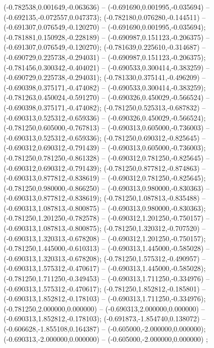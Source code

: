  (-0.782538,0.001649,-0.063636) -- (-0.691690,0.001995,-0.035694) -- (-0.692135,-0.072557,0.047373);
 (-0.782180,0.076280,-0.144511) -- (-0.691307,0.076549,-0.120270) -- (-0.691690,0.001995,-0.035694);
 (-0.781881,0.150928,-0.228189) -- (-0.690987,0.151123,-0.206375) -- (-0.691307,0.076549,-0.120270);
 (-0.781639,0.225610,-0.314687) -- (-0.690729,0.225738,-0.294031) -- (-0.690987,0.151123,-0.206375);
 (-0.781456,0.300342,-0.404021) -- (-0.690533,0.300414,-0.383259) -- (-0.690729,0.225738,-0.294031);
 (-0.781330,0.375141,-0.496209) -- (-0.690398,0.375171,-0.474082) -- (-0.690533,0.300414,-0.383259);
 (-0.781263,0.450024,-0.591270) -- (-0.690326,0.450029,-0.566524) -- (-0.690398,0.375171,-0.474082);
 (-0.781250,0.525313,-0.687832) -- (-0.690313,0.525312,-0.659336) -- (-0.690326,0.450029,-0.566524);
 (-0.781250,0.605000,-0.767813) -- (-0.690313,0.605000,-0.736003) -- (-0.690313,0.525312,-0.659336);
 (-0.781250,0.690312,-0.825645) -- (-0.690312,0.690312,-0.791439) -- (-0.690313,0.605000,-0.736003);
 (-0.781250,0.781250,-0.861328) -- (-0.690312,0.781250,-0.825645) -- (-0.690312,0.690312,-0.791439);
 (-0.781250,0.877812,-0.874863) -- (-0.690313,0.877812,-0.838619) -- (-0.690312,0.781250,-0.825645);
 (-0.781250,0.980000,-0.866250) -- (-0.690313,0.980000,-0.830363) -- (-0.690313,0.877812,-0.838619);
 (-0.781250,1.087813,-0.835488) -- (-0.690313,1.087813,-0.800875) -- (-0.690313,0.980000,-0.830363);
 (-0.781250,1.201250,-0.782578) -- (-0.690312,1.201250,-0.750157) -- (-0.690313,1.087813,-0.800875);
 (-0.781250,1.320312,-0.707520) -- (-0.690313,1.320313,-0.678208) -- (-0.690312,1.201250,-0.750157);
 (-0.781250,1.445000,-0.610313) -- (-0.690313,1.445000,-0.585028) -- (-0.690313,1.320313,-0.678208);
 (-0.781250,1.575312,-0.490957) -- (-0.690313,1.575312,-0.470617) -- (-0.690313,1.445000,-0.585028);
 (-0.781250,1.711250,-0.349453) -- (-0.690313,1.711250,-0.334976) -- (-0.690313,1.575312,-0.470617);
 (-0.781250,1.852812,-0.185801) -- (-0.690313,1.852812,-0.178103) -- (-0.690313,1.711250,-0.334976);
 (-0.781250,2.000000,0.000000) -- (-0.690313,2.000000,0.000000) -- (-0.690313,1.852812,-0.178103);
 (-0.691873,-1.854740,0.138072) -- (-0.606628,-1.855108,0.164387) -- (-0.605000,-2.000000,0.000000);
 (-0.690313,-2.000000,0.000000) -- (-0.605000,-2.000000,0.000000) ;
